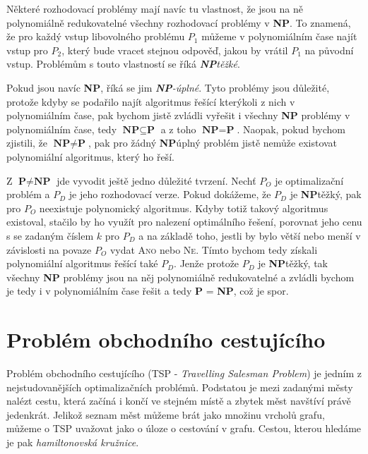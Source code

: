 \documentclass[
  biblatex,
  figures=false,
  glossaries,
  index
]{kidiplom}
\begin{document}
Některé rozhodovací problémy mají navíc tu vlastnost, že jsou na ně polynomiálně redukovatelné všechny rozhodovací problémy v \textbf{NP}. To znamená, že pro každý vstup libovolného problému $P_1$ můžeme v polynomiálním čase najít vstup pro $P_2$, který bude vracet stejnou odpověď, jakou by vrátil $P_1$ na původní vstup. Problémům s touto vlastností se říká \textit{\textbf{NP}\textendash těžké}.

Pokud jsou navíc \textbf{NP}, říká se jim \textit{\textbf{NP}-úplné}. Tyto problémy jsou důležité, protože kdyby se podařilo najít algoritmus řešící kterýkoli z nich v polynomiálním čase, pak bychom jistě zvládli vyřešit i všechny \textbf{NP} problémy v polynomiálním čase, tedy $\textbf{NP} \subseteq \textbf{P}$ a z toho $\textbf{NP} = \textbf{P}$. Naopak, pokud bychom zjistili, že $\textbf{NP} \neq \textbf{P}$, pak pro žádný \textbf{NP}\textendash úplný problém jistě nemůže existovat polynomiální algoritmus, který ho řeší.

Z $\textbf{P} \neq \textbf{NP}$ jde vyvodit ještě jedno důležité tvrzení. Nechť $P_O$ je optimalizační problém a $P_D$ je jeho rozhodovací verze. Pokud dokážeme, že $P_D$ je \textbf{NP}\textendash těžký, pak pro $P_O$ neexistuje polynomický algoritmus. Kdyby totiž takový algoritmus existoval, stačilo by ho využít pro nalezení optimálního řešení, porovnat jeho cenu s se zadaným číslem $k$ pro $P_D$ a na základě toho, jestli by bylo větší nebo menší v závislosti na povaze $P_O$ vydat \textsc{Ano} nebo \textsc{Ne}. Tímto bychom tedy získali polynomiální algoritmus řešící také $P_D$. Jenže protože $P_D$ je \textbf{NP}\textendash těžký, tak všechny \textbf{NP} problémy jsou na něj polynomiálně redukovatelné a zvládli bychom je tedy i v polynomiálním čase řešit a tedy \textbf{P} = \textbf{NP}, což je spor.


\pagebreak
\section{Problém obchodního cestujícího}
Problém obchodního cestujícího (TSP - \textit{Travelling Salesman Problem}) je jedním z nejstudovanějších optimalizačních problémů. Podstatou je mezi zadanými městy nalézt cestu, která začíná i končí ve stejném místě a zbytek měst navštíví právě jedenkrát. Jelikož seznam měst můžeme brát jako množinu vrcholů grafu, můžeme o TSP uvažovat jako o úloze o cestování v grafu. Cestou, kterou hledáme je pak \textit{hamiltonovská kružnice}.
\end{document}
